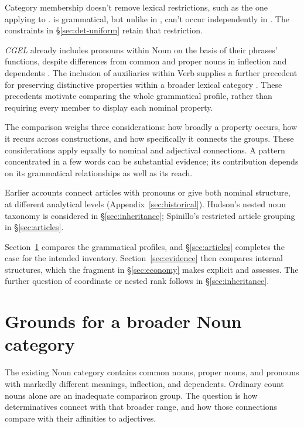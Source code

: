 \documentclass[12pt]{article}
\begin{document}
Category membership doesn't remove lexical restrictions, such as the one applying to .  is grammatical, but unlike  in ,  can't occur independently in . The constraints in §\ref{sec:det-uniform} retain that restriction.

\textit{CGEL} already includes pronouns within Noun on the basis of their phrases' functions, despite differences from common and proper nouns in inflection and dependents \citep[327--328]{huddleston2002}. The inclusion of auxiliaries within Verb supplies a further precedent for preserving distinctive properties within a broader lexical category \citep{pullumwilson1977}. These precedents motivate comparing the whole grammatical profile, rather than requiring every member to display each nominal property.

The comparison weighs three considerations: how broadly a property occurs, how it recurs across constructions, and how specifically it connects the groups. These considerations apply equally to nominal and adjectival connections. A pattern concentrated in a few words can be substantial evidence; its contribution depends on its grammatical relationships as well as its reach.

Earlier accounts connect articles with pronouns or give both nominal structure, at different analytical levels (Appendix~\ref{sec:historical}). Hudson's nested noun taxonomy is considered in §\ref{sec:inheritance}; Spinillo's restricted article grouping in §\ref{sec:articles}.

Section~\ref{sec:proposal} compares the grammatical profiles, and §\ref{sec:articles} completes the case for the intended inventory. Section~\ref{sec:evidence} then compares internal structures, which the fragment in §\ref{sec:economy} makes explicit and assesses. The further question of coordinate or nested rank follows in §\ref{sec:inheritance}.

\section{Grounds for a broader Noun category}\label{sec:proposal}

The existing Noun category contains common nouns, proper nouns, and pronouns with markedly different meanings, inflection, and dependents. Ordinary count nouns alone are an inadequate comparison group. The question is how determinatives connect with that broader range, and how those connections compare with their affinities to adjectives.
\end{document}

